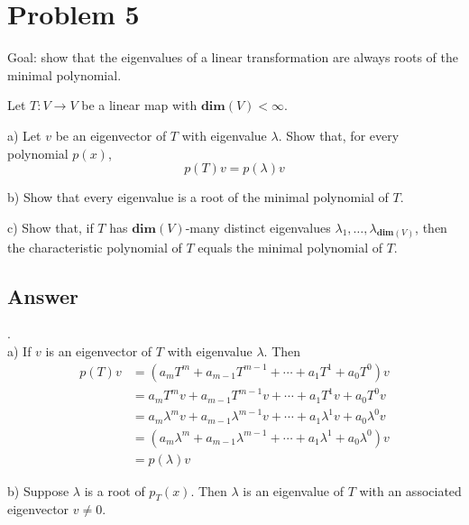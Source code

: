 \documentclass[
	12pt, %
]{fphw}
\newcommand\br{\vspace{10 pt}}
\newcommand\0{\mathbf{0}}
\newcommand\ls[2]{\text{$#1_1, \ldots, #1_{#2}$}}
\renewcommand\dim[1]{\mathbf{dim}(#1)}
\begin{document}
\section*{Problem 5}
\begin{problem}
Goal: show that the eigenvalues of a linear transformation are always roots of the minimal polynomial.

\br
\noindent
Let $T : V \to V$ be a linear map with $\dim{V} < \infty$.

\br
\noindent
a) Let $v$ be an eigenvector of $T$ with eigenvalue $\lambda$. Show that, for every polynomial $p(x)$,
\begin{equation*}
p(T)v = p(\lambda)v
\end{equation*}

\br
\noindent
b) Show that every eigenvalue is a root of the minimal polynomial of $T$.

\br
\noindent
c) Show that, if $T$ has $\dim{V}$-many distinct eigenvalues $\ls{\lambda}{\dim{V}}$, then the characteristic polynomial of $T$ equals the minimal polynomial of $T$.


\end{problem}

\subsection*{Answer} .\\
a) If $v$ is an eigenvector of $T$ with eigenvalue $\lambda$. Then
\begin{align*}
p(T)v &= (a_m T^m + a_{m-1} T^{m-1} + \cdots + a_1 T^1 + a_0 T^0)v \\
&= a_m T^m v + a_{m-1} T^{m-1} v + \cdots + a_1 T^1 v + a_0 T^0 v \\
&= a_m \lambda^m v + a_{m-1} \lambda^{m-1} v + \cdots + a_1 \lambda^1 v + a_0 \lambda^0 v \\
&= (a_m \lambda^m + a_{m-1} \lambda^{m-1} + \cdots + a_1 \lambda^1 + a_0 \lambda^0) v \\
&= p(\lambda) v
\end{align*}

\noindent
b) Suppose $\lambda$ is a root of $p_T(x)$. Then $\lambda$ is an eigenvalue of $T$ with an associated eigenvector $v \ne 0$. 
\end{document}
